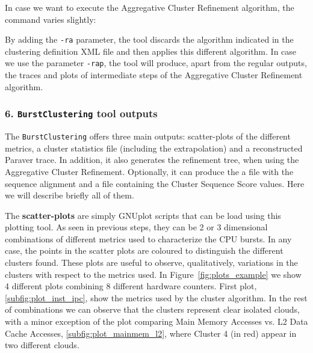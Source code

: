\documentclass[twoside,a4,english,11pt]{book}
\begin{document}
In case we want to execute the Aggregative Cluster Refinement algorithm, the
command varies slightly:

\begin{figure}[!h]
  

\end{figure}

By adding the \texttt{-ra} parameter, the tool discards the algorithm
indicated in the clustering definition XML file and then applies this
different algorithm. In case we use the parameter \texttt{-rap}, the tool
will produce, apart from the regular outputs, the traces and plots of 
intermediate steps of the Aggregative Cluster Refinement algorithm.

\subsubsection*{6. \texttt{BurstClustering} tool outputs}

The \texttt{BurstClustering} offers three main outputs: scatter-plots of
the different metrics, a cluster statistics file (including the extrapolation)
and a reconstructed Paraver trace. In addition, it also generates the
refinement tree, when using the Aggregative Cluster Refinement. Optionally,
it can produce the a file with the sequence alignment and a file containing
the Cluster Sequence Score values. Here we will describe briefly all of them.

The \textbf{scatter-plots} are simply GNUplot scripts that can be load using
this plotting tool. As seen in previous steps, they can be 2 or 3 dimensional
combinations of different metrics used to characterize the CPU bursts. In any
case, the points in the scatter plots are coloured to distinguish the
different clusters found. These plots are useful to observe, qualitatively,
variations in the clusters with respect to the metrics used. In 
Figure~\ref{fig:plots_example} we show 4 different plots combining 8 different
hardware counters. First plot, \ref{subfig:plot_inst_ipc}, show the metrics
used by the cluster algorithm. In the rest of combinations we can observe that 
the clusters represent clear isolated clouds, with a minor exception of
the plot comparing Main Memory Accesses vs. L2 Data Cache Accesses,
\ref{subfig:plot_mainmem_l2}, where Cluster 4 (in red) appear in two different
clouds.
\end{document}
